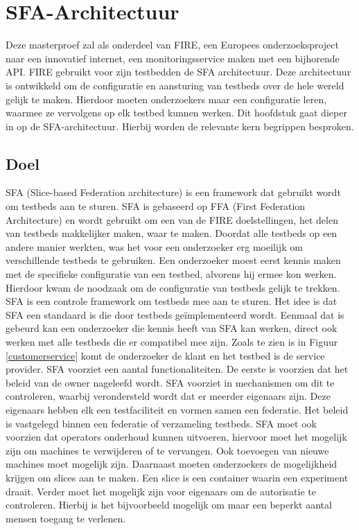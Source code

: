 \chapter{SFA-Architectuur}

{\samenvatting Deze masterproef zal als onderdeel van FIRE, een Europees onderzoeksproject naar een innovatief internet, een monitoringsservice maken met een bijhorende API. FIRE gebruikt voor zijn testbedden de SFA architectuur. Deze architectuur is ontwikkeld om de configuratie en aansturing van testbeds over de hele wereld gelijk te maken. Hierdoor moeten onderzoekers maar een configuratie leren, waarmee ze vervolgens op elk testbed kunnen werken. Dit hoofdstuk gaat dieper in op de SFA-architectuur. Hierbij worden de relevante kern begrippen besproken.}

\section{Doel}
\npar
SFA (Slice-based Federation architecture) is een framework dat gebruikt wordt om testbeds aan te sturen\citep{SFA-overview}. SFA is gebaseerd op FFA (First Federation Architecture) en wordt gebruikt om een van de FIRE doelstellingen, het delen van testbeds makkelijker maken, waar te maken. Doordat alle testbeds op een andere manier werkten, was het voor een onderzoeker erg moeilijk om verschillende testbeds te gebruiken. Een onderzoeker moest eerst kennis maken met de specifieke configuratie van een testbed, alvorens hij ermee kon werken. Hierdoor kwam de noodzaak om de configuratie van testbeds gelijk te trekken.
\clearpage
\npar
SFA is een controle framework om testbeds mee aan te sturen. Het idee is dat SFA een standaard is die door testbeds geïmplementeerd wordt. Eenmaal dat is gebeurd kan een onderzoeker die kennis heeft van SFA kan werken, direct ook werken met alle testbeds die er compatibel mee zijn. Zoals te zien is in Figuur \ref{customerservice} komt de onderzoeker de klant en het testbed is de service provider.
\npar
SFA voorziet een aantal functionaliteiten. De eerste is voorzien dat het beleid van de owner nageleefd wordt. SFA voorziet in mechanismen om dit te controleren, waarbij verondersteld wordt dat er meerder eigenaars zijn. Deze eigenaars hebben elk een testfaciliteit en vormen samen een federatie. Het beleid is vastgelegd binnen een federatie of verzameling testbeds.
\npar
SFA moet ook voorzien dat operators onderhoud kunnen uitvoeren, hiervoor moet het mogelijk zijn om machines te verwijderen of te vervangen. Ook toevoegen van nieuwe machines moet mogelijk zijn. Daarnaast moeten onderzoekers de mogelijkheid krijgen om slices aan te maken. Een slice is een container waarin een experiment draait. Verder moet het mogelijk zijn voor eigenaars om de autorisatie te controleren. Hierbij is het bijvoorbeeld mogelijk om maar een beperkt aantal mensen toegang te verlenen.
\clearpage
